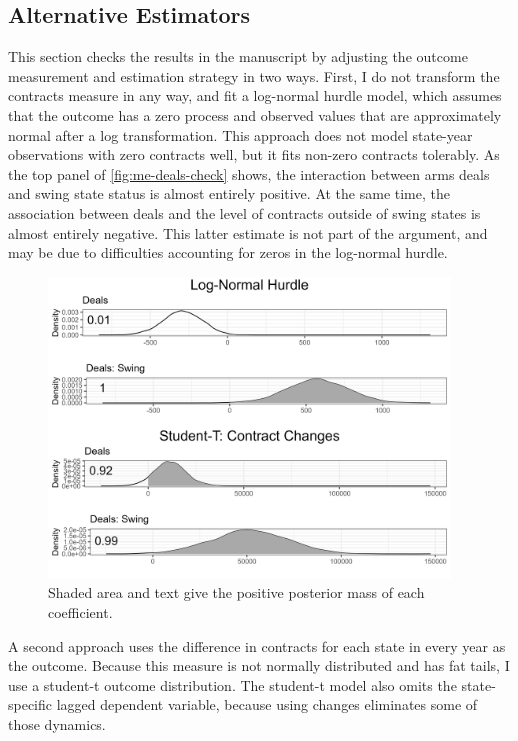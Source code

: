 \documentclass[12pt]{article}
\begin{document}
\subsection{Alternative Estimators}

This section checks the results in the manuscript by adjusting the outcome measurement and estimation strategy in two ways.
First, I do not transform the contracts measure in any way, and fit a log-normal hurdle model, which assumes that the outcome has a zero process and observed values that are approximately normal after a log transformation. 
This approach does not model state-year observations with zero contracts well, but it fits non-zero contracts tolerably. 
As the top panel of \autoref{fig:me-deals-check} shows, the interaction between arms deals and swing state status is almost entirely positive.
At the same time, the association between deals and the level of contracts outside of swing states is almost entirely negative. 
This latter estimate is not part of the argument, and may be due to difficulties accounting for zeros in the log-normal hurdle. 
 

\begin{figure}[htpb]
	\centering
		\includegraphics[width=0.95\textwidth]{me-deals-check.png}
	\caption{Shaded area and text give the positive posterior mass of each coefficient.}
	\label{fig:me-deals-check}
\end{figure}


A second approach uses the difference in contracts for each state in every year as the outcome. 
Because this measure is not normally distributed and has fat tails, I use a student-t outcome distribution.
The student-t model also omits the state-specific lagged dependent variable, because using changes eliminates some of those dynamics. 
\end{document}
